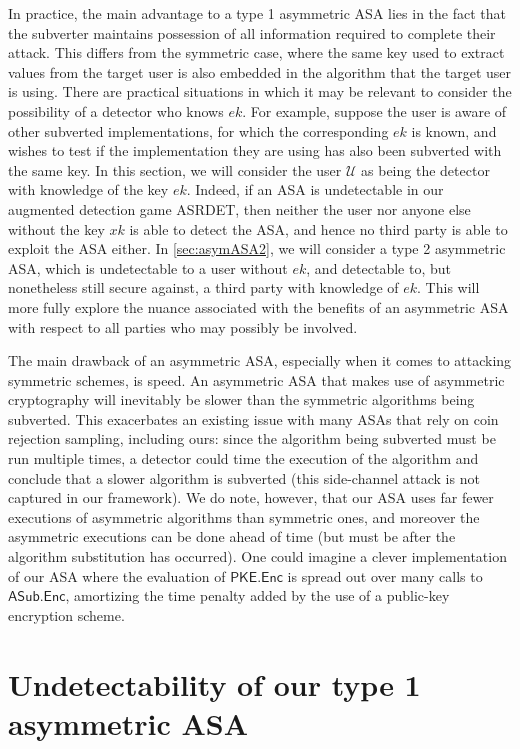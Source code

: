 In practice, the main advantage to a type 1 asymmetric ASA lies in the fact that the subverter maintains possession of all information required to complete their attack. This differs from the symmetric case, where the same key used to extract values from the target user is also embedded in the algorithm that the target user is using. There are practical situations in which it may be relevant to consider the possibility of a detector who knows $ek$. For example, suppose the user is aware of other subverted implementations, for which the corresponding $ek$ is known, and wishes to test if the implementation they are using has also been subverted with the same key. In this section, we will consider the user $\mathcal{U}$ as being the detector with knowledge of the key $ek$. Indeed, if an ASA is undetectable in our augmented detection game ASRDET, then neither the user nor anyone else without the key $xk$ is able to detect the ASA, and hence no third party is able to exploit the ASA either. In \autoref{sec:asymASA2}, we will consider a type 2 asymmetric ASA, which is undetectable to a user without $ek$, and detectable to, but nonetheless still secure against, a third party with knowledge of $ek$. This will more fully explore the nuance associated with the benefits of an asymmetric ASA with respect to all parties who may possibly be involved.

The main drawback of an asymmetric ASA, especially when it comes to attacking symmetric schemes, is speed. An asymmetric ASA that makes use of asymmetric cryptography will inevitably be slower than the symmetric algorithms being subverted. This exacerbates an existing issue with many ASAs that rely on coin rejection sampling, including ours: since the algorithm being subverted must be run multiple times, a detector could time the execution of the algorithm and conclude that a slower algorithm is subverted (this side-channel attack is not captured in our framework). We do note, however, that our ASA uses far fewer executions of asymmetric algorithms than symmetric ones, and moreover the asymmetric executions can be done ahead of time (but must be after the algorithm substitution has occurred). One could imagine a clever implementation of our ASA where the evaluation of $\mathsf{PKE.Enc}$ is spread out over many calls to $\mathsf{ASub.Enc}$, amortizing the time penalty added by the use of a public-key encryption scheme.

\section{Undetectability of our type 1 asymmetric ASA}

